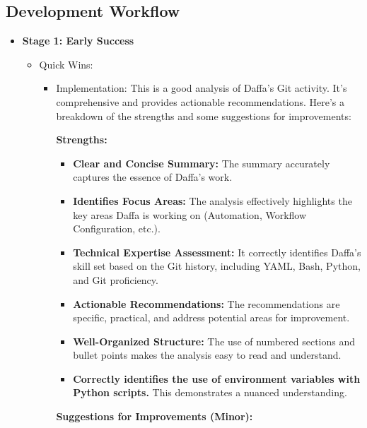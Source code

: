 \documentclass{article}
\begin{document}
\subsection{Development Workflow}

\begin{itemize}
    \item \textbf{Stage 1: Early Success}
    \begin{itemize}
        \item Quick Wins:
        \begin{itemize}
            \item Implementation: This is a good analysis of Daffa's Git activity. It's comprehensive and provides actionable recommendations. Here's a breakdown of the strengths and some suggestions for improvements:

\textbf{Strengths:}

\begin{itemize}
    \item \textbf{Clear and Concise Summary:} The summary accurately captures the essence of Daffa's work.
    \item \textbf{Identifies Focus Areas:}  The analysis effectively highlights the key areas Daffa is working on (Automation, Workflow Configuration, etc.).
    \item \textbf{Technical Expertise Assessment:}  It correctly identifies Daffa's skill set based on the Git history, including YAML, Bash, Python, and Git proficiency.
    \item \textbf{Actionable Recommendations:} The recommendations are specific, practical, and address potential areas for improvement.
    \item \textbf{Well-Organized Structure:} The use of numbered sections and bullet points makes the analysis easy to read and understand.
    \item \textbf{Correctly identifies the use of environment variables with Python scripts.} This demonstrates a nuanced understanding.
\end{itemize}

\textbf{Suggestions for Improvements (Minor):}


\end{itemize}
\end{itemize}
\end{itemize}
\end{document}
